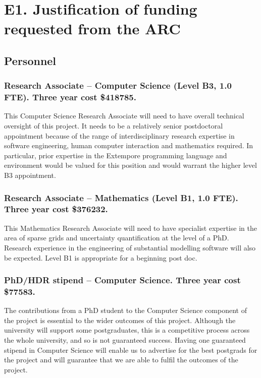 \documentclass[a4paper,fontsize=12pt]{scrartcl}
\author{}
\date{\today}
\begin{document}
\section*{E1. Justification of funding requested from the ARC}
\label{sec:justificatoin}

\subsection*{Personnel}


\subsubsection*{Research Associate – Computer Science (Level B3, 1.0 FTE). Three year cost \$418785.}

This Computer Science Research Associate will need to have overall technical oversight of this project. It needs to be a relatively senior postdoctoral appointment because of the range of interdisciplinary research expertise in software engineering, human computer interaction and mathematics required. In particular, prior expertise in the Extempore programming language and environment would be valued for this position and would warrant the higher level B3 appointment.


\subsubsection*{Research Associate – Mathematics (Level B1, 1.0 FTE).  Three year cost \$376232.}

This Mathematics Research Associate will need to have specialist expertise in the area of sparse grids and uncertainty quantification at the level of a PhD.  Research experience in the engineering of substantial modelling software will also be expected. Level B1 is appropriate for a beginning post doc. 

\subsubsection*{PhD/HDR stipend – Computer Science.  Three year cost \$77583.}

The contributions from a PhD student to the Computer Science component of the project is essential to the wider outcomes of this project.
Although the university will support some postgraduates, this is a competitive
process across the whole university, and so is not guaranteed success. Having one guaranteed stipend in Computer Science will enable us to advertise for the best postgrads for the project and will guarantee that we are able to fulfil the outcomes of the project. 
\end{document}
